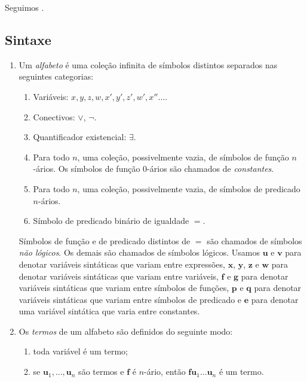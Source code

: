 Seguimos \cite{shoenfield1967}.

\subsection{Sintaxe}

\begin{definition}
    \leavevmode
        \begin{enumerate}[leftmargin=*, align=left, label=\textbf{(\alph*)}]
            \item Um \emph{alfabeto} é uma coleção infinita de símbolos distintos separados nas seguintes categorias:
                \begin{enumerate}[label=\roman*.]
                    \item Variáveis: $x, y, z, w, x', y', z', w', x'' \ldots$.
                    \item Conectivos: $\lor$, $\neg$.
                    \item Quantificador existencial: $\exists$.
                    \item Para todo $n$, uma coleção, possivelmente vazia, de símbolos de função $n$-ários. Os símbolos de função $0$-ários são chamados de \emph{constantes}.
                    \item Para todo $n$, uma coleção, possivelmente vazia, de símbolos de predicado $n$-ários.
                    \item Símbolo de predicado binário de igualdade $=$.
                \end{enumerate}
            Símbolos de função e de predicado distintos de $=$ são chamados de símbolos \emph{não lógicos}. Os demais são chamados de símbolos lógicos. Usamos $\mathbf{u}$ e $\mathbf{v}$ para denotar variáveis sintáticas que variam entre expressões, $\mathbf{x}$, $\mathbf{y}$, $\mathbf{z}$ e $\mathbf{w}$ para denotar variáveis sintáticas que variam entre variáveis, $\mathbf{f}$ e $\mathbf{g}$ para denotar variáveis sintáticas que variam entre símbolos de funções, $\mathbf{p}$ e $\mathbf{q}$ para denotar variáveis sintáticas que variam entre símbolos de predicado e $\mathbf{e}$ para denotar uma variável sintática que varia entre constantes.
            \item Os \emph{termos} de um alfabeto são definidos do seguinte modo:
                \begin{enumerate}[label=\roman*.]
                    \item toda variável é um termo;
                    \item se $\mathbf{u}_1, \ldots, \mathbf{u}_n$ são termos e $\mathbf{f}$ é $n$-ário, então $\mathbf{f} \mathbf{u}_1 \ldots \mathbf{u}_n$ é um termo.

\end{enumerate}
\end{enumerate}
\end{definition}
